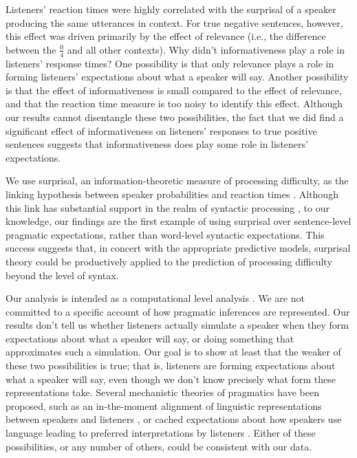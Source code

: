 \documentclass[man, noapacite]{apa2}
\begin{document}
Listeners' reaction times were highly correlated with the surprisal of a speaker producing the same utterances in context. For true negative sentences, however, this effect was driven primarily by the effect of relevance (i.e., the difference between the $\frac{0}{4}$ and all other contexts). Why didn't informativeness play a role in listeners' response times? One possibility is that only relevance plays a role in forming listeners' expectations about what a speaker will say. Another possibility is that the effect of informativeness is small compared to the effect of relevance, and that the reaction time measure is too noisy to identify this effect. Although our results cannot disentangle these two possibilities, the fact that we did find a significant effect of informativeness on listeners' responses to true positive sentences suggests that informativeness does play some role in listeners' expectations. 

We use surprisal, an information-theoretic measure of processing difficulty, as the linking hypothesis between speaker probabilities and reaction times \cite{levy2008}. Although this link has substantial support in the realm of syntactic processing \cite{demberg2008,boston2008}, to our knowledge, our findings are the first example of using surprisal over sentence-level pragmatic expectations, rather than word-level syntactic expectations. This success suggests that, in concert with the appropriate predictive models, surprisal theory could be productively applied to the prediction of processing difficulty beyond the level of syntax. 

Our analysis is intended as a computational level analysis \cite{marr1982}. We are not committed to a specific account of how pragmatic inferences are represented. Our results don't tell us whether listeners actually simulate a speaker when they form expectations about what a speaker will say, or doing something that approximates such a simulation. Our goal is to show at least that the weaker of these two possibilities is true; that is, listeners are forming expectations about what a speaker will say, even though we don't know precisely what form these representations take. Several mechanistic theories of pragmatics have been proposed, such as an in-the-moment alignment of linguistic representations between speakers and listeners \cite{pickering2004}, or cached expectations about how speakers use language leading to preferred interpretations by listeners \cite{levinson2000}. Either of these possibilities, or any number of others, could be consistent with our data. 
\end{document}
